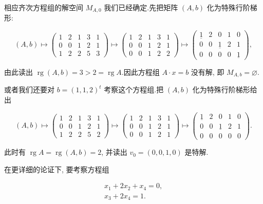 相应齐次方程组的解空间 $M_{A, 0}$ 我们已经确定.先把矩阵 $(A, b)$ 化为特殊行阶梯形:

\[
(A, b) \longmapsto \begin{pmatrix} 1 & 2 & 1 & 3 & 1 \\ 0 & 0 & 1 & 2 & 1 \\ 1 & 2 & 2 & 5 & 3 \end{pmatrix}
\longmapsto \begin{pmatrix} 1 & 2 & 1 & 3 & 1 \\ 0 & 0 & 1 & 2 & 1 \\ 0 & 0 & 1 & 2 & 2 \end{pmatrix}
\longmapsto \begin{pmatrix} \underline{1} & 2 & 0 & 1 & 0 \\ 0 & 0 & \underline{1} & 2 & 1 \\ 0 & 0 & 0 & 0 & \underline{1} \end{pmatrix},
\]

由此读出 $\operatorname{rg}(A, b) = 3 > 2 = \operatorname{rg} A$.因此方程组 $A \cdot x = b$ 没有解, 即 $M_{A, b} = \varnothing$.

或者我们还要对 $b = (1, 1, 2)^t$ 考察这个方程组.把 $(A, b)$ 化为特殊行阶梯形给出

\[
(A, b) \longmapsto \begin{pmatrix} 1 & 2 & 1 & 3 & 1 \\ 0 & 0 & 1 & 2 & 1 \\ 1 & 2 & 2 & 5 & 2 \end{pmatrix}
\longmapsto \begin{pmatrix} 1 & 2 & 1 & 3 & 1 \\ 0 & 0 & 1 & 2 & 1 \\ 0 & 0 & 1 & 2 & 1 \end{pmatrix}
\longmapsto \begin{pmatrix} \underline{1} & 2 & 0 & 1 & 0 \\ 0 & 0 & \underline{1} & 2 & 1 \\ 0 & 0 & 0 & 0 & 0 \end{pmatrix}\text{.}
\]

此时有 $\operatorname{rg} A = \operatorname{rg}(A, b) = 2$, 并读出 $v_0 = (0, 0, 1, 0)$ 是特解.

在更详细的论证下, 要考察方程组

\[
\begin{array}{c}
x_1 + 2x_2 + x_4 = 0, \\
x_3 + 2x_4 = 1\text{.}
\end{array}
\]

